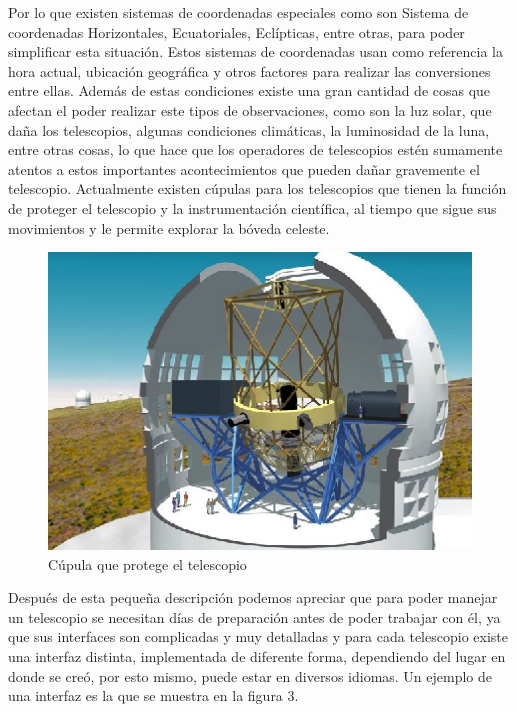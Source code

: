 \documentclass[letterpaper,titlepage,spanish,10pt]{article}
\begin{document}
Por lo que existen sistemas de coordenadas especiales como son Sistema de coordenadas 
Horizontales, Ecuatoriales, Ecl\'ipticas, entre otras, para poder simplificar 
esta situaci\'on. Estos sistemas de coordenadas usan como referencia la hora actual, 
ubicaci\'on geogr\'afica y otros factores para realizar las conversiones entre ellas.
 Adem\'as de estas condiciones existe una gran cantidad de cosas que afectan el poder
realizar este tipos de observaciones, como son la luz solar, que da\~na los telescopios, 
algunas condiciones clim\'aticas, la luminosidad de la luna, entre otras cosas, lo que 
hace que los operadores de telescopios est\'en sumamente atentos a estos importantes 
acontecimientos que pueden da\~nar gravemente el telescopio. Actualmente existen
c\'upulas para los telescopios que tienen la funci\'on de proteger el telescopio y 
la instrumentaci\'on cient\'ifica, al tiempo que sigue sus movimientos y le permite 
explorar la b\'oveda celeste.
\newpage
\begin{figure}[h!]
 \centering
 \includegraphics[scale=1.5]{cup.eps}
 \caption{C\'upula que protege el telescopio}
\end{figure}

Despu\'es de esta peque\~na descripci\'on podemos apreciar que para poder manejar 
un telescopio se necesitan d\'ias de preparaci\'on antes de poder trabajar con 
\'el, ya que sus interfaces son complicadas y muy detalladas y para cada telescopio 
existe una interfaz distinta, implementada de diferente forma, dependiendo del lugar
en donde se cre\'o, por esto mismo, puede estar en diversos idiomas. Un ejemplo de 
una interfaz es la que se muestra en la figura 3.
\end{document}
